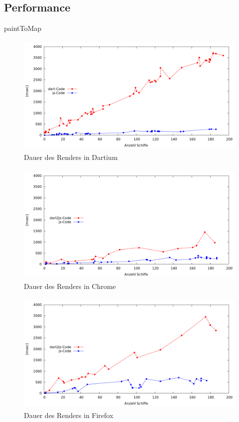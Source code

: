 \subsection{Performance}
paintToMap
\newpage

\begin {figure}[H]
\begin{center}
  \includegraphics[height=2.3in]{images/Dartium.png}
\end{center}
 \caption{Dauer des Renders in Dartium}
\end {figure}


\begin {figure}[H]
\begin{center}
  \includegraphics[height=2.3in]{images/Chrome.png}
\end{center}
 \caption{Dauer des Renders in Chrome}
\end {figure}


\begin {figure}[H]
\begin{center}
  \includegraphics[height=2.3in]{images/Firefox.png}
\end{center}
 \caption{Dauer des Renders in Firefox}
\end {figure}


